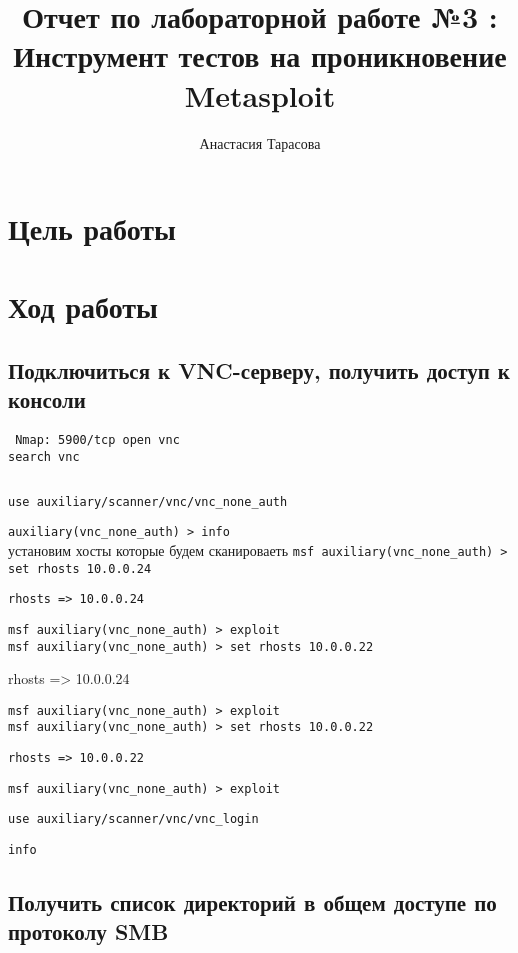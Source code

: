 \documentclass[12pt,a4paper]{article}
\author{Анастасия Тарасова}
\title{Отчет по лабораторной работе №3 :\\ Инструмент тестов на проникновение Metasploit}
\begin{document}
\maketitle
\section{Цель работы}

\section{Ход работы}

\newpage
\subsection{Подключиться к VNC-серверу, получить доступ к консоли}

\verb| Nmap: 5900/tcp open vnc|\\

\verb|search vnc|

\begin{lstlisting}

\end{lstlisting}

\verb|use auxiliary/scanner/vnc/vnc_none_auth |

\verb|auxiliary(vnc_none_auth) > info|\\

установим хосты которые будем сканироваеть
\verb|msf auxiliary(vnc_none_auth) > set rhosts 10.0.0.24|

\verb|rhosts => 10.0.0.24|

\verb|msf auxiliary(vnc_none_auth) > exploit|\\


\verb|msf auxiliary(vnc_none_auth) > set rhosts 10.0.0.22|

rhosts => 10.0.0.24

\verb|msf auxiliary(vnc_none_auth) > exploit|\\


\verb|msf auxiliary(vnc_none_auth) > set rhosts 10.0.0.22|

\verb|rhosts => 10.0.0.22|

\verb|msf auxiliary(vnc_none_auth) > exploit|

\verb|use auxiliary/scanner/vnc/vnc_login|

\verb|info|

\newpage
\subsection{Получить список директорий в общем доступе по протоколу SMB}
\end{document}
